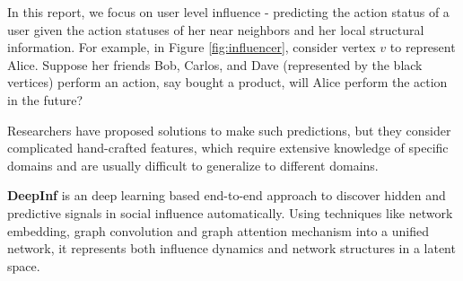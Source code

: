In this report, we focus on user level influence - predicting the action status of a user given the action statuses of her near neighbors and her local structural information. For example, in Figure \ref{fig:influencer}, consider vertex $v$ to represent Alice. Suppose her friends Bob, Carlos, and Dave (represented by the black vertices) perform an action, say bought a product, will Alice perform the action in the future?


Researchers have proposed solutions to make such predictions, but they consider complicated hand-crafted features, which require extensive knowledge of specific domains and are usually difficult to generalize to different domains.


\textbf{DeepInf} is an deep learning based end-to-end approach to discover hidden and predictive signals in social influence automatically. Using techniques like network embedding, graph convolution and graph attention mechanism into a unified network, it represents both influence dynamics and network structures in a latent space.

